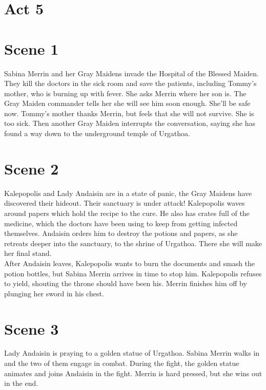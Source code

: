 \section{Act 5}

\section{Scene 1}

Sabina Merrin and her Gray Maidens invade the Hospital of the Blessed Maiden. They kill the doctors in the sick room and save the patients, including Tommy's mother, who is burning up with fever. She asks Merrin where her son is. The Gray Maiden commander tells her she will see him soon enough. She'll be safe now. Tommy's mother thanks Merrin, but feels that she will not survive. She is too sick. Then another Gray Maiden interrupts the conversation, saying she has found a way down to the underground temple of Urgathoa.\\

\section{Scene 2}

Kalepopolis and Lady Andaisin are in a state of panic, the Gray Maidens have discovered their hideout. Their sanctuary is under attack! Kalepopolis waves around papers which hold the recipe to the cure. He also has crates full of the medicine, which the doctors have been using to keep from getting infected themselves. Andaisin orders him to destroy the potions and papers, as she retreats deeper into the sanctuary, to the shrine of Urgathoa. There she will make her final stand.\\

After Andaisin leaves, Kalepopolis wants to burn the documents and smash the potion bottles, but Sabina Merrin arrives in time to stop him. Kalepopolis refuses to yield, shouting the throne should have been his. Merrin finishes him off by plunging her sword in his chest.\\

\section{Scene 3}

Lady Andaisin is praying to a golden statue of Urgathoa. Sabina Merrin walks in and the two of them engage in combat. During the fight, the golden statue animates and joins Andaisin in the fight. Merrin is hard pressed, but she wins out in the end.\\

